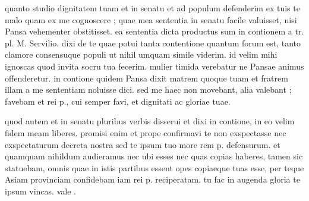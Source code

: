 


 quanto studio dignitatem tuam et in senatu et ad populum defenderim ex tuis te malo quam ex me cognoscere ; quae mea sententia in senatu facile valuisset, nisi Pansa vehementer obstitisset. ea sententia dicta productus sum in contionem a tr. pl. M. Servilio. dixi de te quae potui tanta contentione quantum forum est, tanto clamore consensuque populi ut nihil umquam simile viderim. id velim mihi ignoscas quod invita socru tua fecerim. mulier timida verebatur ne Pansae animus offenderetur. in contione quidem Pansa dixit matrem quoque tuam et fratrem illam a me sententiam noluisse dici. sed me haec non movebant, alia valebant ; favebam et rei p., cui semper favi, et dignitati ac gloriae tuae.

 quod autem et in senatu pluribus verbis disserui et dixi in contione, in eo velim fidem meam liberes. promisi enim et prope confirmavi te non exspectasse nec exspectaturum decreta nostra sed te ipsum tuo more rem p. defensurum. et quamquam nihildum audieramus nec ubi esses nec quas copias haberes, tamen sic statuebam, omnis quae in istis partibus essent opes copiaeque tuas esse, per teque Asiam provinciam confidebam iam rei p. reciperatam. tu fac in augenda gloria te ipsum vincas. vale .
